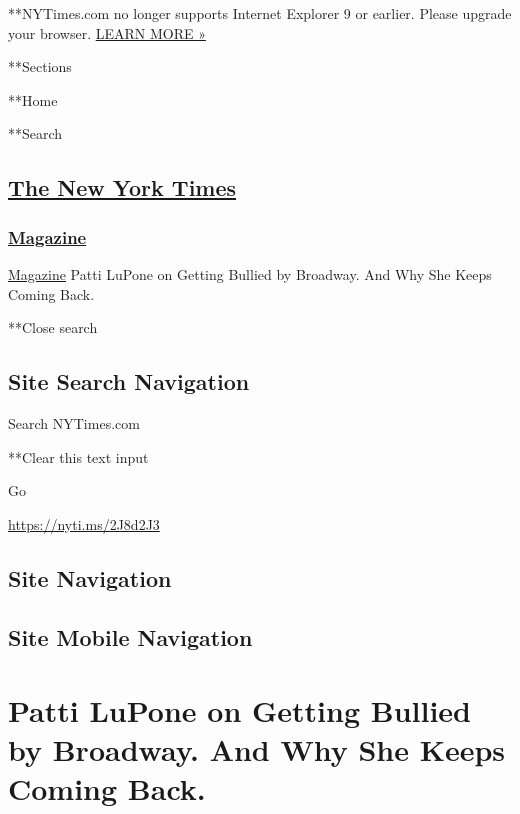  **NYTimes.com no longer supports Internet Explorer 9 or earlier. Please
upgrade your browser.
\href{http://www.nytimes3xbfgragh.onion/content/help/site/ie9-support.html}{LEARN
MORE »}

**Sections

**Home

**Search

\hypertarget{the-new-york-times}{%
\subsection{\texorpdfstring{\href{http://www.nytimes3xbfgragh.onion/}{The
New York Times}}{The New York Times}}\label{the-new-york-times}}

\hypertarget{-magazine-}{%
\subsubsection{\texorpdfstring{
\href{https://www.nytimes3xbfgragh.onion/section/magazine}{Magazine}
}{ Magazine }}\label{-magazine-}}

 \href{https://www.nytimes3xbfgragh.onion/section/magazine}{Magazine}
\textbar{}Patti LuPone on Getting Bullied by Broadway. And Why She Keeps
Coming Back.

**Close search

\hypertarget{site-search-navigation}{%
\subsection{Site Search Navigation}\label{site-search-navigation}}

Search NYTimes.com

**Clear this text input

Go

\url{https://nyti.ms/2J8d2J3}

\hypertarget{site-navigation}{%
\subsection{Site Navigation}\label{site-navigation}}

\hypertarget{site-mobile-navigation}{%
\subsection{Site Mobile Navigation}\label{site-mobile-navigation}}

\hypertarget{patti-lupone-on-getting-bullied-by-broadway-and-why-she-keeps-coming-back}{%
\section{Patti LuPone on Getting Bullied by Broadway. And Why She Keeps
Coming
Back.}\label{patti-lupone-on-getting-bullied-by-broadway-and-why-she-keeps-coming-back}}

